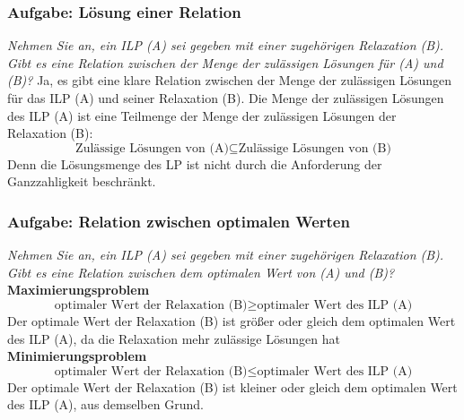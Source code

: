 \documentclass{article}
\begin{document}
\newpage
\subsubsection{Aufgabe: Lösung einer Relation \textcolor{ForestGreen}{\CheckmarkBold}}
\textit{Nehmen Sie an, ein ILP (A) sei gegeben mit einer zugehörigen Relaxation  (B). Gibt 
es eine Relation zwischen der Menge der zulässigen Lösungen für (A) und (B)? } \cite{probeklausur21} \cite{probeklausur24}\newline \newline
Ja, es gibt eine klare Relation zwischen der Menge der zulässigen Lösungen für das ILP (A) und seiner Relaxation (B).  \newline
Die Menge der zulässigen Lösungen des ILP (A) ist eine Teilmenge der Menge der zulässigen Lösungen der Relaxation (B): 
    \[
\text{Zulässige Lösungen von (A)} \subseteq \text{Zulässige Lösungen von (B)}
\]
Denn die Lösungsmenge des LP ist nicht durch die Anforderung der Ganzzahligkeit beschränkt. 

\newpage
\subsubsection{Aufgabe: Relation zwischen optimalen Werten \textcolor{ForestGreen}{\CheckmarkBold}}
\textit{Nehmen Sie an, ein ILP (A) sei gegeben mit einer zugehörigen Relaxation  (B). Gibt es eine Relation zwischen dem optimalen Wert von (A) und (B)?} \cite{probeklausur21} \cite{probeklausur24}
\newline \newline
\textbf{Maximierungsproblem}
\[
\text{optimaler Wert der Relaxation (B)} \geq \text{optimaler Wert des ILP (A)}
\]
Der optimale Wert der Relaxation (B) ist größer oder gleich dem optimalen Wert des ILP (A), da die Relaxation mehr zulässige Lösungen hat \newline \newline
\textbf{Minimierungsproblem}
\[
\text{optimaler Wert der Relaxation (B)} \leq \text{optimaler Wert des ILP (A)}
\]
Der optimale Wert der Relaxation (B) ist kleiner oder gleich dem optimalen Wert des ILP (A), aus demselben Grund.
\end{document}
